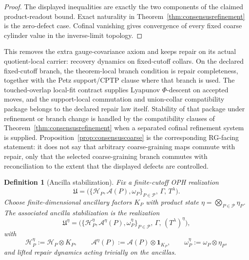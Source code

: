 \documentclass[11pt]{article}
\newtheorem{definition}[theorem]{Definition}
\begin{document}
\begin{proof}
The displayed inequalities are exactly the two components of the claimed product-readout bound.
Exact naturality in Theorem~\ref{thm:consensusrefinement} is the zero-defect case. Cofinal
vanishing gives convergence of every fixed coarse cylinder value in the inverse-limit topology.
\end{proof}

This removes the extra gauge-covariance axiom and keeps repair on its actual quotient-local
carrier: recovery dynamics on fixed-cutoff collars. On the declared fixed-cutoff branch, the
theorem-local branch condition is repair completeness, together with the Petz support/CPTP clause
where that branch is used. The touched-overlap local-fit contract supplies Lyapunov
\(\Phi\)-descent on accepted moves, and the support-local commutation and union-collar
compatibility package belongs to the declared repair law itself. Stability of that package under
refinement or branch change is handled by the compatibility clauses of
Theorem~\ref{thm:consensusrefinement} when a separated cofinal refinement system is supplied.
Proposition~\ref{prop:consensuscoarse} is the corresponding RG-facing statement: it does not say
that arbitrary coarse-graining maps commute with repair, only that the selected coarse-graining
branch commutes with reconciliation to the extent that the displayed defects are controlled.

\begin{definition}[Ancilla stabilization]\label{def:ancillastab}
Fix a finite-cutoff OPH realization
\[
\mathfrak U=
\bigl(\{\mathcal H_P,\mathcal A(P),\omega_P\}_{P\in\mathcal P},\,\Gamma,\,T^\lambda\bigr).
\]
Choose finite-dimensional ancillary factors \(K_P\) with product state \(\eta=\bigotimes_{P\in\mathcal P}\eta_P\). The associated ancilla stabilization is the realization
\[
\mathfrak U^\eta=
\bigl(\{\mathcal H_P^\eta,\mathcal A^\eta(P),\omega_P^\eta\}_{P\in\mathcal P},\,\Gamma,\,(T^\lambda)^\eta\bigr),
\]
with
\[
\mathcal H_P^\eta:=\mathcal H_P\otimes K_P,\qquad
\mathcal A^\eta(P):=\mathcal A(P)\otimes \mathbf 1_{K_P},\qquad
\omega_P^\eta:=\omega_P\otimes \eta_P,
\]
and lifted repair dynamics acting trivially on the ancillas.
\end{definition}
\end{document}
